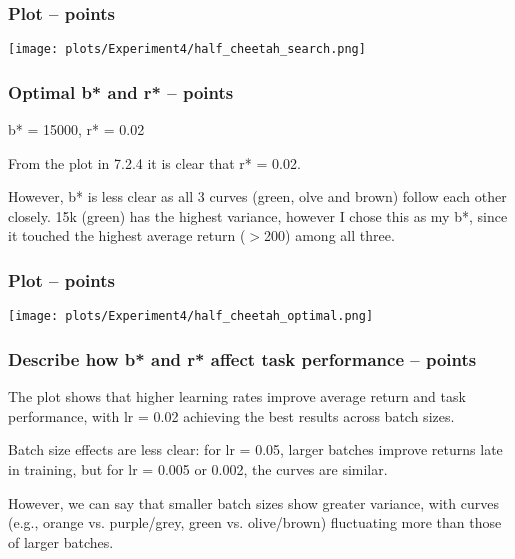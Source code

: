 \documentclass{article}
\begin{document}
\subsubsection{Plot --  points\rbrack}
\begin{answer}[title=Q7.2.2,height=10cm,width=\linewidth]
\centering
\texttt{[image: plots/Experiment4/half\_cheetah\_search.png]}
\end{answer}

\subsubsection{ Optimal b* and r* --  points\rbrack}
\begin{answer}[title=Q7.2.3,height=4cm,width=\linewidth]
b* = 15000, r* = 0.02

From the plot in 7.2.4 it is clear that r* = 0.02. 

However, b* is less clear as all 3 curves (green, olve and brown) follow each other closely. 
15k (green) has the highest variance, however I chose this as my b*, since it touched the highest average return ($>$200) among all three.
\end{answer}

\subsubsection{ Plot --  points\rbrack}
\begin{answer}[title=Q7.2.4,height=10cm,width=\linewidth]
\centering
\texttt{[image: plots/Experiment4/half\_cheetah\_optimal.png]}
\end{answer}

\subsubsection{ Describe how b* and r* affect task performance --  points\rbrack}
\begin{answer}[title=Q7.2.5,height=4cm,width=\linewidth]
The plot shows that higher learning rates improve average return and task performance, with lr = 0.02 achieving the best results across batch sizes.

Batch size effects are less clear: for lr = 0.05, larger batches improve returns late in training, but for lr = 0.005 or 0.002, the curves are similar.

However, we can say that smaller batch sizes show greater variance, with curves (e.g., orange vs. purple/grey, green vs. olive/brown) fluctuating more than those of larger batches.
\end{answer}
\end{document}
